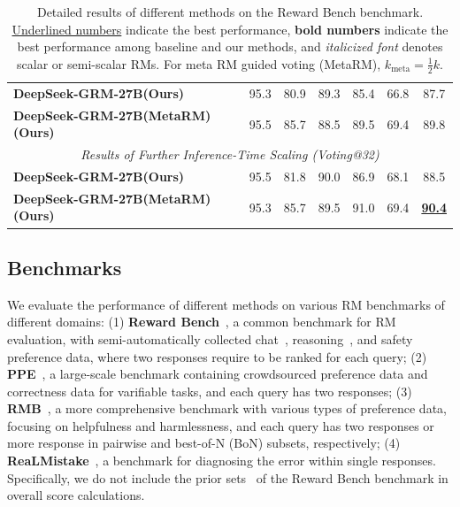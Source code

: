 \documentclass{article} %
\newcommand{\SGRM}{DeepSeek-GRM-27B\xspace}
\begin{document}
\begin{table}[t]
{\begin{tabular}{lcccccc}
  \textbf{\SGRM (Ours)} & 95.3 & 80.9 & 89.3 & 85.4 & 66.8  &   87.7 \\
  \textbf{\SGRM (MetaRM) (Ours)} & 95.5 & 85.7 & 88.5 & 89.5 & 69.4  & 89.8   \\
  \midrule
  \multicolumn{7}{c}{\textit{Results of Further Inference-Time Scaling (Voting@32)}} \\
  \textbf{\SGRM (Ours)} & 95.5 & 81.8 & 90.0 & 86.9 & 68.1  & 88.5 \\
  \textbf{\SGRM (MetaRM) (Ours)} &95.3   &  85.7   &  89.5   &  91.0 &  69.4  & \uline{\textbf{90.4}} \\
  \bottomrule
  \end{tabular}
  }
  \caption{Detailed results of different methods on the Reward Bench benchmark. \uline{Underlined numbers} indicate the best performance, \textbf{bold numbers} indicate the best performance among baseline and our methods, and \textit{italicized font} denotes scalar or semi-scalar RMs. For meta RM guided voting (MetaRM), $k_{\mathrm{meta}} = \frac{1}{2}k$.}
  \label{tab:rb-results-detail}
  \vspace{-1em}
\end{table}


\subsection{Benchmarks}

We evaluate the performance of different methods on various RM benchmarks of different domains: (1) \textbf{Reward Bench}~\citep{lambert2024rewardbenchevaluatingrewardmodels}, a common benchmark for RM evaluation, with semi-automatically collected chat~\citep{alpaca_eval,chatbot-arena,zeng2024evaluating}, reasoning~\citep{lightman2024lets,muennighoff2024octopack}, and safety~\citep{rottger-etal-2024-xstest,wang-etal-2024-answer} preference data, where two responses require to be ranked for each query; (2) \textbf{PPE}~\citep{frick2025how}, a large-scale benchmark containing crowdsourced preference data and correctness data for varifiable tasks, and each query has two responses; (3) \textbf{RMB}~\citep{zhou2025rmb}, a more comprehensive benchmark with various types of preference data, focusing on helpfulness and harmlessness, and each query has two responses or more response in pairwise and best-of-N (BoN) subsets, respectively; (4) \textbf{ReaLMistake}~\citep{kamoi2024evaluating}, a benchmark for diagnosing the error within single responses. Specifically, we do not include the prior sets~\citep{bai2022traininghelpfulharmlessassistant,askell2021generallanguageassistantlaboratory,pmlr-v162-ethayarajh22a,10.5555/3495724.3495977} of the Reward Bench benchmark in overall score calculations. 
\end{document}

